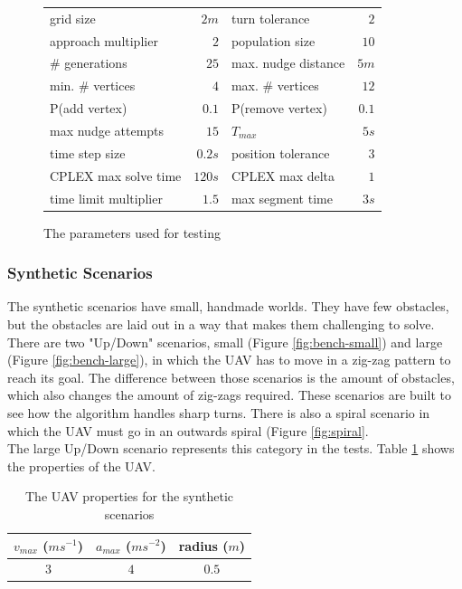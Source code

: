 \begin{figure}[h]
\centering
\begin{tabular}{ l  r | l r }
grid size 			& $2m$ 	& turn tolerance 		& $2$ \\
approach multiplier & $2$ 	& population size 		& $ 10$ \\
\# generations 		& $25$ 	& max. nudge distance 	& $5m$\\
min. \# vertices 	& $ 4$ 	& max. \# vertices 		& $12$ \\
P(add vertex) 		& $0.1$ & P(remove vertex) 		& $0.1$  \\
max nudge attempts 	& $15$ 	& $ T_{max}$ 			& $5s$ \\
time step size 		& $0.2s$& position tolerance & $3$ \\
CPLEX max solve time & $120s$ & CPLEX max delta & $1$ \\
time limit multiplier & $1.5$ & max segment time & $3s$\\
\end{tabular}
\caption{The parameters used for testing}
\label{table:params}
\end{figure}
\clearpage
\subsubsection{Synthetic Scenarios}
\label{subsec:synth}
The synthetic scenarios have small, handmade worlds. They have few obstacles, but the obstacles are laid out in a way that makes them challenging to solve. There are two "Up/Down" scenarios, small (Figure \ref{fig:bench-small}) and large (Figure \ref{fig:bench-large}), in which the UAV has to move in a zig-zag pattern to reach its goal. The difference between those scenarios is the amount of obstacles, which also changes the amount of zig-zags required. These scenarios are built to see how the algorithm handles sharp turns. There is also a spiral scenario in which the UAV must go in an outwards spiral (Figure \ref{fig:spiral}.\\
The large Up/Down scenario represents this category in the tests. Table \ref{table:uav-synth} shows the properties of the UAV.

\begin{table}[h]
\centering
\begin{tabular}{ c | c | c }
$v_{max}$ ($ms^{-1}$)	& $a_{max}$ ($ms^{-2}$) 	& radius ($m$) 	 \\
\hline
$3$ & $4$ 	& $0.5$ \\
\end{tabular}
\caption{The UAV properties for the synthetic scenarios}
\label{table:uav-synth}
\end{table}

